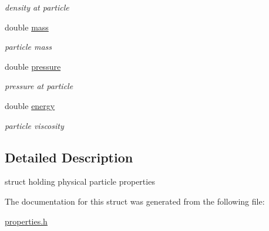 \begin{DoxyCompactItemize}
\begin{DoxyCompactList}\small\item\em density at particle \end{DoxyCompactList}\item 
\hypertarget{structProperties_aded5ddc676b930dfbdfa81f78ef2547e}{double \hyperlink{structProperties_aded5ddc676b930dfbdfa81f78ef2547e}{mass}}\label{structProperties_aded5ddc676b930dfbdfa81f78ef2547e}

\begin{DoxyCompactList}\small\item\em particle mass \end{DoxyCompactList}\item 
\hypertarget{structProperties_a001e790a070fc788d99ab472330e70fb}{double \hyperlink{structProperties_a001e790a070fc788d99ab472330e70fb}{pressure}}\label{structProperties_a001e790a070fc788d99ab472330e70fb}

\begin{DoxyCompactList}\small\item\em pressure at particle \end{DoxyCompactList}\item 
\hypertarget{structProperties_a4150d32dbe414d5bdc2ee4143ca19831}{double \hyperlink{structProperties_a4150d32dbe414d5bdc2ee4143ca19831}{energy}}\label{structProperties_a4150d32dbe414d5bdc2ee4143ca19831}

\begin{DoxyCompactList}\small\item\em particle viscosity \end{DoxyCompactList}\end{DoxyCompactItemize}


\subsection{\-Detailed \-Description}
struct holding physical particle properties 

\-The documentation for this struct was generated from the following file\-:\begin{DoxyCompactItemize}
\item 
\hyperlink{properties_8h}{properties.\-h}\end{DoxyCompactItemize}
